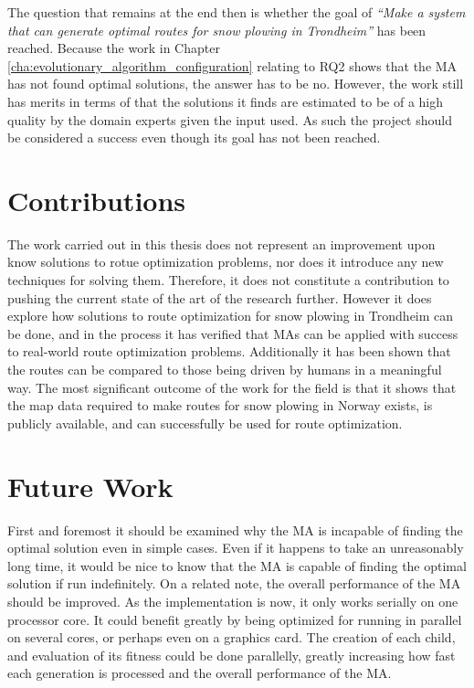 The question that remains at the end then is whether the goal of \emph{\enquote{Make a system that can generate optimal routes for snow plowing in Trondheim}} has been reached. Because the work in Chapter \ref{cha:evolutionary_algorithm_configuration} relating to RQ2 shows that the MA has not found optimal solutions, the answer has to be no. However, the work still has merits in terms of that the solutions it finds are estimated to be of a high quality by the domain experts given the input used. As such the project should be considered a success even though its goal has not been reached.


\section{Contributions}

The work carried out in this thesis does not represent an improvement upon know solutions to rotue optimization problems, nor does it introduce any new techniques for solving them. Therefore, it does not constitute a contribution to pushing the current state of the art of the research further. However it does explore how solutions to route optimization for snow plowing in Trondheim can be done, and in the process it has verified that MAs can be applied with success to real-world route optimization problems. Additionally it has been shown that the routes can be compared to those being driven by humans in a meaningful way. The most significant outcome of the work for the field is that it shows that the map data required to make routes for snow plowing in Norway exists, is publicly available, and can successfully be used for route optimization.

\section{Future Work}

First and foremost it should be examined why the MA is incapable of finding the optimal solution even in simple cases. Even if it happens to take an unreasonably long time, it would be nice to know that the MA is capable of finding the optimal solution if run indefinitely. On a related note, the overall performance of the MA should be improved. As the implementation is now, it only works serially on one processor core. It could benefit greatly by being optimized for running in parallel on several cores, or perhaps even on a graphics card. The creation of each child, and evaluation of its fitness could be done parallelly, greatly increasing how fast each generation is processed and the overall performance of the MA.

